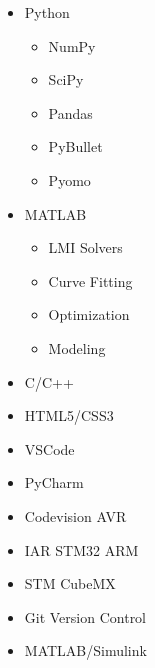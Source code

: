 \documentclass[10pt,a4paper,sans]{moderncv} %
\begin{document}
	\begin{cvcolumns}
		{
			\vspace{-0.5em}
				\begin{itemize}[nosep]
					\item Python
					\begin{itemize}[nosep]
						\item NumPy
						\item SciPy
						\item Pandas
						\item PyBullet
						\item Pyomo
					\end{itemize}
					\item MATLAB
					\begin{itemize}[nosep]
						\item LMI Solvers
						\item Curve Fitting
						\item Optimization
						\item Modeling %
					\end{itemize}
					\item C/C++
					\item HTML5/CSS3
				\end{itemize}
		}
		{
			\vspace{-0.5em}
				\begin{itemize}[nosep]
					\item VSCode
					\item PyCharm
					\item Codevision AVR
					\item IAR STM32 ARM
					\item STM CubeMX
					\item Git Version Control
				\end{itemize}
		}
		{
			\vspace{-0.5em}
				\begin{itemize}[nosep]
					\item MATLAB/Simulink
					\begin{itemize}[nosep]

\end{itemize}
\end{itemize}}
\end{cvcolumns}
\end{document}
